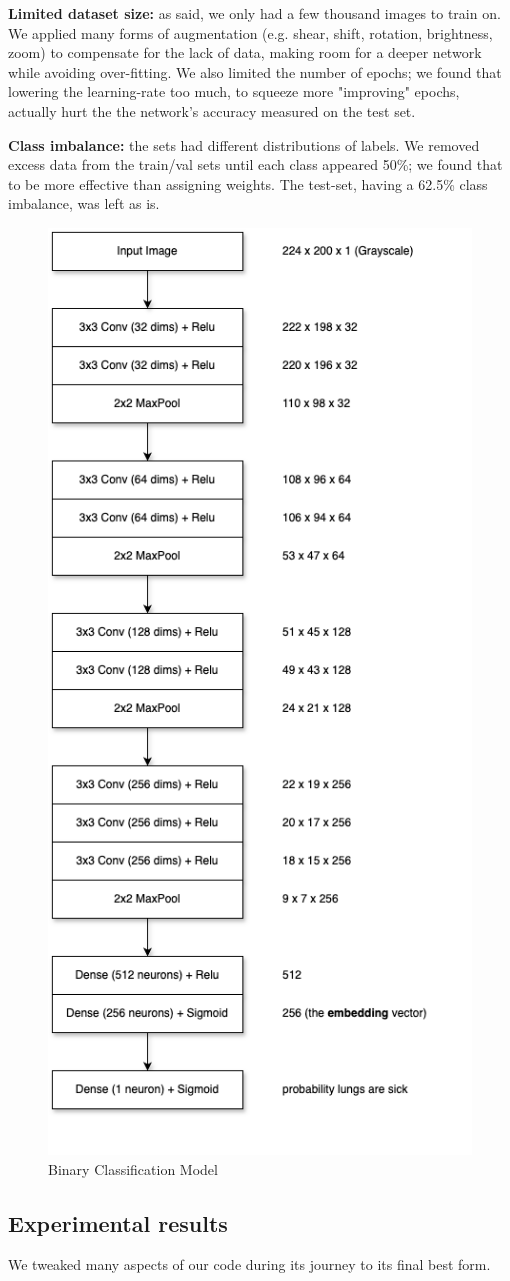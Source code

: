 \documentclass{article}
\begin{document}
\textbf{Limited dataset size:} as said, we only had a few thousand images to train on.
We applied many forms of augmentation (e.g. shear, shift, rotation, brightness, zoom) to compensate for the lack of data, making room for a deeper network while avoiding over-fitting. We also limited the number of epochs; we found that lowering the learning-rate too much, to squeeze more "improving" epochs, actually hurt the the network's accuracy measured on the test set.

\textbf{Class imbalance:} the sets had different distributions of labels.
We removed excess data from the train/val sets until each class appeared 50\%; we found that to be more effective than assigning weights. The test-set, having a 62.5\% class imbalance, was left as is.

\begin{figure}[H]
  \centering
  \includegraphics[width=0.45\linewidth, angle=90]{model_1.png}
  \caption{Binary Classification Model}
  \label{fig:model_1}
\end{figure}

\subsection{Experimental results}
We tweaked many aspects of our code during its journey to its final best form.
\end{document}
